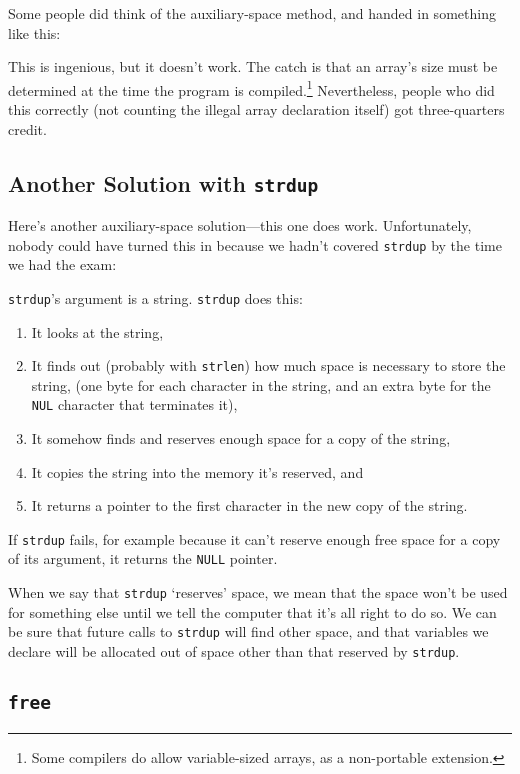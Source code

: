Some people did think of the auxiliary-space method, and handed in
something like this:



This is ingenious, but it doesn't work.  The catch is that an array's
size must be determined at the time the program is
compiled.\footnote{Some compilers do allow variable-sized arrays, as a
non-portable extension.} Nevertheless, people who did this correctly
(not counting the illegal array declaration itself) got three-quarters
credit.

\subsection{Another Solution with {\tt strdup}}

Here's another auxiliary-space solution---this one does work.
Unfortunately, nobody could have turned this in because we hadn't
covered {\tt strdup} by the time we had the exam:



{\tt strdup}'s argument is a string.  {\tt strdup} does this:

\begin{enumerate}
\item It looks at the string,
\item It finds out (probably with {\tt strlen}) how much space is
necessary to store the string, 
(one byte for each character in the string, and an extra byte for the
{\tt NUL} character that terminates it),
\item It  somehow finds and reserves
enough space for a copy of the string,
\item It copies the string into the memory it's reserved, and
\item It returns a pointer to the first character in the new copy of the
string.
\end{enumerate}

If {\tt strdup} fails, for example because it can't reserve enough free
space for a copy of its argument, it returns the {\tt NULL} pointer.

When we say that {\tt strdup} `reserves' space, we mean that the space
won't be used for something else until we tell the computer that it's
all right to do so.  We can be sure that future calls to {\tt strdup}
will find other space, and that variables we declare will be allocated
out of space other than that reserved by {\tt strdup}.

\subsection{{\tt free}}

